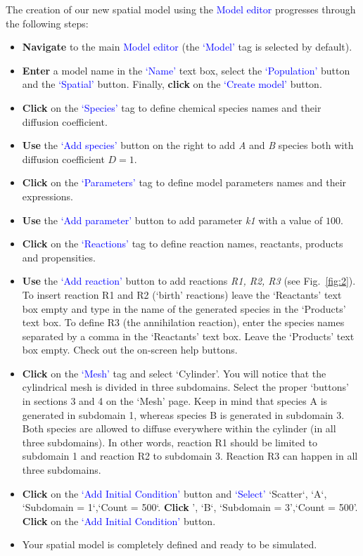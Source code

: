 The creation of our new spatial model using the \textcolor{blue}{Model editor} progresses through the following steps:
\begin{itemize}
\item \textbf{Navigate} to the main \textcolor{blue}{Model editor} (the \textcolor{blue}{`Model'} tag is selected by default).
\item \textbf{Enter} a model name in the \textcolor{blue}{`Name'} text box, select the \textcolor{blue}{`Population'} button and the \textcolor{blue}{`Spatial'} button. Finally, \textbf{click} on the \textcolor{blue}{`Create model'}  button.
 \item \textbf{Click} on the \textcolor{blue}{`Species'} tag to define chemical species names and their diffusion coefficient. 
 \item \textbf{Use} the \textcolor{blue}{`Add species'} button on the right to add \textit{A} and \textit{B} species both with diffusion coefficient $D=1$.
 \item \textbf{Click} on the \textcolor{blue}{`Parameters'} tag to define model parameters names and their expressions. 
 \item \textbf{Use} the \textcolor{blue}{`Add parameter'} button to add parameter \textit{k1} with a value of $100$.
 \item \textbf{Click} on the \textcolor{blue}{`Reactions'} tag to define reaction names, reactants, products and propensities.
 \item \textbf{Use} the \textcolor{blue}{`Add reaction'} button to add reactions \textit{R1, R2, R3} (see Fig.~\ref{fig:2}). To insert reaction R1 and R2 (`birth' reactions) leave the `Reactants' text box empty and type in the name of the generated species in the `Products' text box.
 To define R3 (the annihilation reaction), enter the species names separated by a comma in the 
`Reactants' text box. Leave the `Products' text box empty. Check out the on-screen help buttons.
 \item \textbf{Click} on the \textcolor{blue}{`Mesh'} tag and select `Cylinder'. You will notice that the cylindrical mesh is divided in three subdomains. Select the proper `buttons' in sections 3 and 4 on the `Mesh' page. Keep in mind that species A is generated in subdomain 1, whereas species B is generated in subdomain 3. Both species are allowed to diffuse everywhere within the cylinder (in all three subdomains). In other words, reaction R1 should be limited to subdomain 1 and reaction R2 to subdomain 3. Reaction R3 can happen in all three subdomains.
  \item \textbf{Click} on the \textcolor{blue}{`Add Initial Condition'} button and \textcolor{blue}{`Select'} `Scatter`, `A`, `Subdomain = 1`,`Count = 500`. \textbf{Click} ', `B`, `Subdomain = 3',`Count = 500'. \textbf{Click} on the \textcolor{blue}{`Add Initial Condition'} button.
\item Your spatial model is completely defined and ready to be simulated.


\end{itemize}
